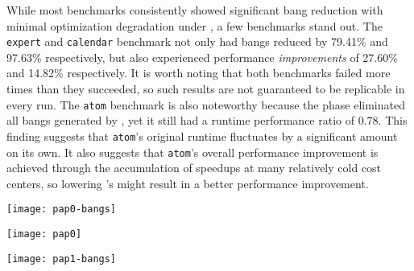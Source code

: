 While most benchmarks consistently showed significant bang reduction
with minimal optimization degradation under \At{}, a few benchmarks stand
out. The \texttt{expert} and \texttt{calendar} benchmark not only had
bangs reduced by 79.41\% and 97.63\% respectively, but also
experienced performance \textit{improvements} of 27.60\% and 14.82\%
respectively. It is worth noting that both benchmarks failed
more times than they succeeded, so such results are not guaranteed to
be replicable in every run. The \texttt{atom} benchmark is also noteworthy
because the \postopt{} phase eliminated all bangs
generated by \Ao{}, yet it still had a runtime performance ratio of
0.78. This finding suggests that \texttt{atom}'s original
runtime fluctuates by a significant amount on its own. It also
suggests that \texttt{atom}'s overall performance
improvement is achieved through the accumulation of speedups at many
relatively cold cost centers, so lowering \At{}'s \hotspotcost{}
might result in a better performance improvement.

\begin{figure*}
\texttt{[image: pap0-bangs]}
\label{fig:2-bangs-26}
\end{figure*}

\begin{figure*}
\texttt{[image: pap0]}
\label{fig:2-ratio-26}
\end{figure*}

\begin{figure*}
\texttt{[image: pap1-bangs]}
\label{fig:2-bangs-52}
\end{figure*}

